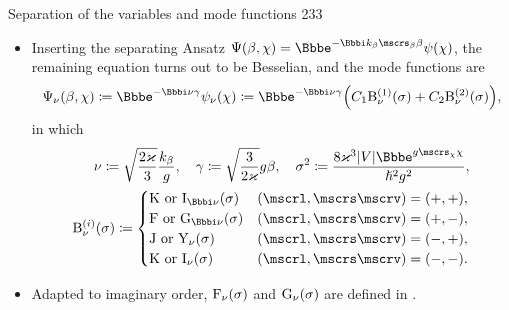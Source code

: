 \documentclass[9pt]{beamer}
\begin{document}
\begin{frame}%
{Separation of the variables and mode functions}%
{233}
\begin{itemize}
\item
Inserting the separating Ansatz $\rfun{\Psi}{\beta,\chi} =
\ee^{-\ii k_\beta\mscrs_\beta\beta}\rfun{\psi}{\chi}$, the remaining
equation turns out to be Besselian, and the mode functions are
\begin{align}
\rfun{\Psi_\nu}{\beta, \chi} \coloneqq
\ee^{-\ii \nu \gamma} \rfun{\psi_\nu}{\chi} \coloneqq
\ee^{-\ii \nu \gamma} \rbr{C_1\rfun{\mathrm{B}_{\nu}^{(1)}}{\sigma}
+C_2\rfun{\mathrm{B}_{\nu}^{(2)}}{\sigma}},
\end{align}
in which
\begin{align}
\nu \coloneqq \sqrt{\frac{2\varkappa}{3}}\frac{k_\beta}{g},\quad
\gamma \coloneqq \sqrt{\frac{3}{2\varkappa}}g\beta,\quad
\sigma^2 \coloneqq 
\frac{8\varkappa^3\vbr{V}\ee^{g\mscrs_\chi\chi}}{\hslash^2 g^2},\\
\label{eq:trsf-quantum-sigma}
\rfun{\mathrm{B}^{(i)}_{\nu}}{\sigma} \coloneqq
\begin{cases}
\mathrm{K}\text{ or }\rfun{\mathrm{I}_{\ii\nu}}{\sigma}
& \rbr{\mscrl, \mscrs\mscrv} = \rbr{+,+}, \\
\mathrm{F}\text{ or }\rfun{\mathrm{G}_{\ii\nu}}{\sigma}
& \rbr{\mscrl, \mscrs\mscrv} = \rbr{+,-}, \\
\mathrm{J}\text{ or }\rfun{\mathrm{Y}_{\nu}}{\sigma}
& \rbr{\mscrl, \mscrs\mscrv} = \rbr{-,+}, \\
\mathrm{K}\text{ or }\rfun{\mathrm{I}_{\nu}}{\sigma}
& \rbr{\mscrl, \mscrs\mscrv} = \rbr{-,-}. \\
\end{cases}
\end{align}
\item Adapted to imaginary order, ${\mathrm{F}_{\nu}}\mathopen{}\left(\sigma\right)\mathclose{}$ and
${\mathrm{G}_{\nu}}\mathopen{}\left(\sigma\right)\mathclose{}$ are defined in .
\end{itemize}
\end{frame}
\end{document}
